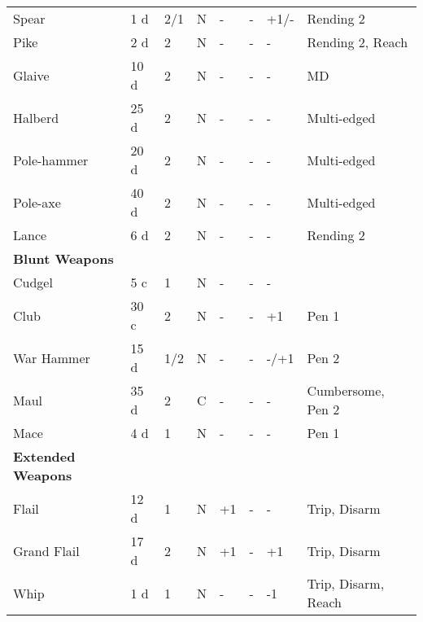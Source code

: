 \documentclass[a4paper,11pt,oneside]{book}
\begin{document}
\begin{table}[ht!]
\begin{tabular}{|l|l|l|l|l|l|l|l|}
		Spear & 1 d & 2/1 & N & - & - & +1/- & Rending 2 \\
		Pike & 2 d & 2 & N & - & - & - & Rending 2, Reach\\
		Glaive & 10 d & 2 & N & - & - & - & MD \\
		Halberd & 25 d & 2 & N & - & - & - & Multi-edged\\
		Pole-hammer & 20 d & 2 & N & - & - & - & Multi-edged\\ 
		Pole-axe & 40 d & 2 & N & - & - & - & Multi-edged \\
		Lance & 6 d & 2 & N & - & - & - & Rending 2\\
		\hline
		\textbf{Blunt Weapons} & & & & & & & \\
		\hline
		Cudgel & 5 c & 1  & N & - & - & - &  \\
		Club & 30 c & 2 & N & - & - & +1 & Pen 1 \\
		War Hammer & 15 d & 1/2 & N & - & - & -/+1 & Pen 2 \\ 
		Maul & 35 d & 2 & C & - & - & - & Cumbersome, Pen 2 \\
		Mace & 4 d & 1 & N & - & - & - & Pen 1 \\
		\hline
		\textbf{Extended Weapons} & & & & & & & \\
		\hline
		Flail & 12 d & 1 & N & +1 & - & - & Trip, Disarm \\ 
		Grand Flail & 17 d & 2 & N & +1 & - & +1 & Trip, Disarm\\
		Whip & 1 d & 1 & N & - & - & -1 & Trip, Disarm, Reach\\
		\hline
	\end{tabular}
\end{table}
\end{document}
